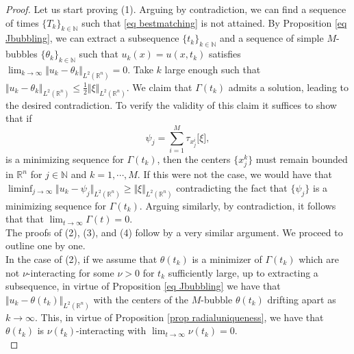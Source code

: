 \documentclass[11pt,letterpaper,reqno]{amsart}
\newcommand{\N}{\mathbb{N}}
\newcommand{\R}{\mathbb{R}}
\theoremstyle{plain}%
\theoremstyle{definition}
\numberwithin{equation}{section}
\numberwithin{figure}{section}
\begin{document}
\begin{proof}
Let us start proving (1). Arguing by contradiction, we can find a sequence of times $\{T_k\}_{k\in \N}$ such that \eqref{eq bestmatching} is not attained. By Proposition \ref{eq Jbubbling}, we can extract a subsequence $\{t_k\}_{k\in \N}$ and a sequence of simple $M$-bubbles $\{\theta_k\}_{k\in \N}$ such that $u_k(x)=u(x,t_k)$ satisfies $\lim_{k\to \infty} \Vert u_k -\theta_k\Vert_{L^2(\R^n)} =0 $. Take $k$ large enough such that $\Vert u_k -\theta_k\Vert_{L^2(\R^n)} \leq \frac{1}{2} \Vert \xi\Vert_{L^2(\R^n)}$. We claim that $\Gamma(t_k)$ admits a solution, leading to the desired contradiction. To verify the validity of this claim it suffices to show that if
\begin{equation*}
    \psi_j = \sum_{i=1}^M  \tau_{x^i_j}\big[\xi\big],
\end{equation*}
is a minimizing sequence for $\Gamma(t_k)$, then the centers $\{x_j^k\}$ must remain bounded in $\R^n$ for $j\in \N$ and $k=1,\cdots, M$. If this were not the case, we would have that $\liminf_{j\to \infty} \Vert u_k -\psi_j\Vert_{L^2(\R^n)} \geq \Vert\xi\Vert_{L^2(\R^n)}$ contradicting the fact that $\{\psi_j\}$ is a minimizing sequence for $\Gamma(t_k)$.
Arguing similarly, by contradiction, it follows that that $\lim_{t \to \infty} \Gamma(t)=0$.\\

The proofs of (2), (3), and (4) follow by a very similar argument. We proceed to outline one by one.\\

In the case of (2), if we assume that $\theta(t_k)$ is a minimizer of $\Gamma(t_k)$ which are not $\nu$-interacting for some $\nu>0$ for $t_k$ sufficiently large, up to extracting a subsequence, in virtue of Proposition \ref{eq Jbubbling} we have that $\Vert u_k -\theta(t_k)\Vert_{L^2(\R^n)}$ with the centers of the $M$-bubble $\theta(t_k)$ drifting apart as $k\to \infty$. This, in virtue of Proposition \ref{prop radialuniqueness}, we have that $\theta(t_k)$ is $\nu(t_k)$-interacting with $\lim_{t\to \infty} \nu(t_k)=0$.\\


\end{proof}
\end{document}
